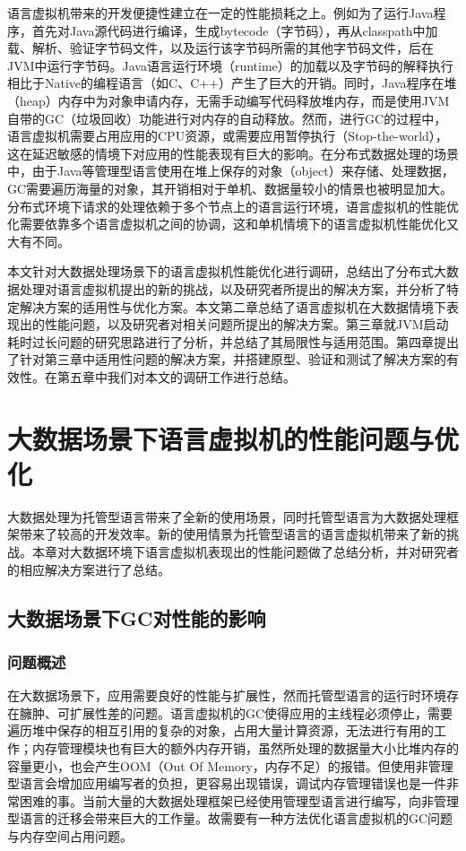 \documentclass[lang=cn,12pt,a4paper,cite=authoryear]{elegantpaper}
\begin{document}
语言虚拟机带来的开发便捷性建立在一定的性能损耗之上。例如为了运行Java程序，首先对Java源代码进行编译，生成bytecode（字节码），再从classpath中加载、解析、验证字节码文件，以及运行该字节码所需的其他字节码文件，后在JVM中运行字节码。Java语言运行环境（runtime）的加载以及字节码的解释执行相比于Native的编程语言（如C、C++）产生了巨大的开销。同时，Java程序在堆（heap）内存中为对象申请内存，无需手动编写代码释放堆内存，而是使用JVM自带的GC（垃圾回收）功能进行对内存的自动释放。然而，进行GC的过程中，语言虚拟机需要占用应用的CPU资源，或需要应用暂停执行（Stop-the-world），这在延迟敏感的情境下对应用的性能表现有巨大的影响。在分布式数据处理的场景中，由于Java等管理型语言使用在堆上保存的对象（object）来存储、处理数据，GC需要遍历海量的对象，其开销相对于单机、数据量较小的情景也被明显加大。分布式环境下请求的处理依赖于多个节点上的语言运行环境，语言虚拟机的性能优化需要依靠多个语言虚拟机之间的协调，这和单机情境下的语言虚拟机性能优化又大有不同。

本文针对大数据处理场景下的语言虚拟机性能优化进行调研，总结出了分布式大数据处理对语言虚拟机提出的新的挑战，以及研究者所提出的解决方案，并分析了特定解决方案的适用性与优化方案。本文第二章总结了语言虚拟机在大数据情境下表现出的性能问题，以及研究者对相关问题所提出的解决方案。第三章就JVM启动耗时过长问题的研究思路进行了分析，并总结了其局限性与适用范围。第四章提出了针对第三章中适用性问题的解决方案，并搭建原型、验证和测试了解决方案的有效性。在第五章中我们对本文的调研工作进行总结。

\section{大数据场景下语言虚拟机的性能问题与优化}
大数据处理为托管型语言带来了全新的使用场景，同时托管型语言为大数据处理框架带来了较高的开发效率。新的使用情景为托管型语言的语言虚拟机带来了新的挑战。本章对大数据环境下语言虚拟机表现出的性能问题做了总结分析，并对研究者的相应解决方案进行了总结。

\subsection{大数据场景下GC对性能的影响}
\subsubsection{问题概述}
在大数据场景下，应用需要良好的性能与扩展性，然而托管型语言的运行时环境存在臃肿、可扩展性差的问题。语言虚拟机的GC使得应用的主线程必须停止，需要遍历堆中保存的相互引用的复杂的对象，占用大量计算资源，无法进行有用的工作；内存管理模块也有巨大的额外内存开销，虽然所处理的数据量大小比堆内存的容量更小，也会产生OOM（Out Of Memory，内存不足）的报错。但使用非管理型语言会增加应用编写者的负担，更容易出现错误，调试内存管理错误也是一件非常困难的事。当前大量的大数据处理框架已经使用管理型语言进行编写，向非管理型语言的迁移会带来巨大的工作量。故需要有一种方法优化语言虚拟机的GC问题与内存空间占用问题。
\end{document}
